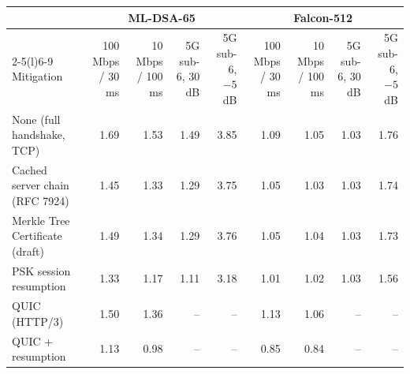 \begin{tabular}{@{}lrrrrrrrr@{}}
\toprule
 & \multicolumn{4}{c}{ML-DSA-65} & \multicolumn{4}{c}{Falcon-512} \\
\cmidrule(lr){2-5}\cmidrule(l){6-9}
Mitigation & 100 Mbps / 30 ms & 10 Mbps / 100 ms & 5G sub-6, 30 dB & 5G sub-6, $-5$ dB & 100 Mbps / 30 ms & 10 Mbps / 100 ms & 5G sub-6, 30 dB & 5G sub-6, $-5$ dB \\
\midrule
None (full handshake, TCP) & 1.69 & 1.53 & 1.49 & 3.85 & 1.09 & 1.05 & 1.03 & 1.76 \\
Cached server chain (RFC 7924) & 1.45 & 1.33 & 1.29 & 3.75 & 1.05 & 1.03 & 1.03 & 1.74 \\
Merkle Tree Certificate (draft) & 1.49 & 1.34 & 1.29 & 3.76 & 1.05 & 1.04 & 1.03 & 1.73 \\
PSK session resumption & 1.33 & 1.17 & 1.11 & 3.18 & 1.01 & 1.02 & 1.03 & 1.56 \\
QUIC (HTTP/3) & 1.50 & 1.36 & -- & -- & 1.13 & 1.06 & -- & -- \\
QUIC + resumption & 1.13 & 0.98 & -- & -- & 0.85 & 0.84 & -- & -- \\
\bottomrule
\end{tabular}
